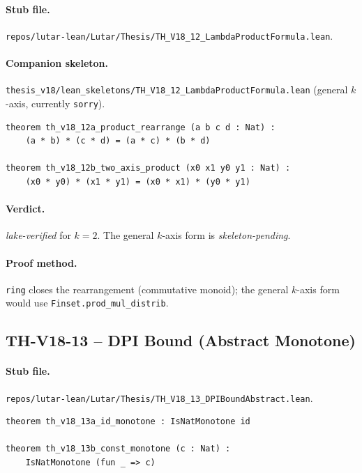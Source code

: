 \paragraph{Stub file.}
\texttt{repos/lutar-lean/Lutar/Thesis/TH\_V18\_12\_LambdaProductFormula.lean}.

\paragraph{Companion skeleton.}
\texttt{thesis\_v18/lean\_skeletons/TH\_V18\_12\_LambdaProductFormula.lean}
(general $k$-axis, currently \texttt{sorry}).

\begin{theorem}[TH-V18-12, geometric mean is multiplicative ($k=2$) -- verbatim Lean]
\label{thm:thv18-12}
\begin{verbatim}
theorem th_v18_12a_product_rearrange (a b c d : Nat) :
    (a * b) * (c * d) = (a * c) * (b * d)

theorem th_v18_12b_two_axis_product (x0 x1 y0 y1 : Nat) :
    (x0 * y0) * (x1 * y1) = (x0 * x1) * (y0 * y1)
\end{verbatim}
\end{theorem}

\paragraph{Verdict.} \emph{lake-verified} for $k=2$. The general
$k$-axis form is \emph{skeleton-pending}.

\paragraph{Proof method.} \texttt{ring} closes the rearrangement
(commutative monoid); the general $k$-axis form would use
\texttt{Finset.prod\_mul\_distrib}.

\subsection{TH-V18-13 -- DPI Bound (Abstract Monotone)}
\label{sub:thv18-13}

\paragraph{Stub file.}
\texttt{repos/lutar-lean/Lutar/Thesis/TH\_V18\_13\_DPIBoundAbstract.lean}.

\begin{theorem}
\label{thm:thv18-13}
\begin{verbatim}
theorem th_v18_13a_id_monotone : IsNatMonotone id

theorem th_v18_13b_const_monotone (c : Nat) :
    IsNatMonotone (fun _ => c)
\end{verbatim}
\end{theorem}

